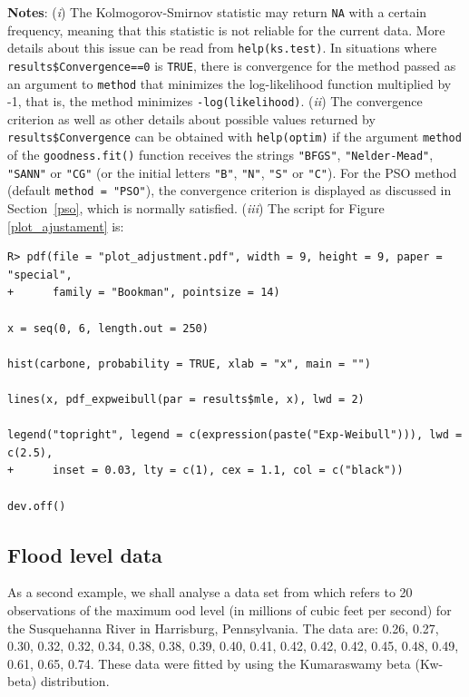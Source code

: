 \documentclass[10pt,letterpaper]{article}
\begin{document}
\textbf{Notes}: ({\it i}) The Kolmogorov-Smirnov statistic may return \texttt{NA} with a certain frequency,
meaning  that this statistic is not reliable for the current data.
More details about this issue can be read from \texttt{help(ks.test)}.
In situations where \texttt{results\$Convergence==0} is \texttt{TRUE}, there is convergence for the method passed as an argument
to \texttt{method} that minimizes the log-likelihood function multiplied by -1, that is, the method minimizes \texttt{-log(likelihood)}.
({\it ii}) The convergence criterion as well as other details about possible values returned by \texttt{results\$Convergence}
can be obtained with \texttt{help(optim)} if the argument \texttt{method} of the \texttt{goodness.fit()} function receives
the strings \texttt{"BFGS"}, \texttt{"Nelder-Mead"}, \texttt{"SANN"} or \texttt{"CG"} (or the initial letters \texttt{"B"}, \texttt{"N"}, \texttt{"S"} or \texttt{"C"}).
For the PSO method  (default \texttt{method = "PSO"}), the convergence criterion is displayed as discussed in Section~\ref{pso}, which is normally  satisfied.
({\it iii}) The script for Figure \ref{plot_ajustament} is:

\begin{verbatim}
R> pdf(file = "plot_adjustment.pdf", width = 9, height = 9, paper = "special",
+      family = "Bookman", pointsize = 14)

x = seq(0, 6, length.out = 250)

hist(carbone, probability = TRUE, xlab = "x", main = "")

lines(x, pdf_expweibull(par = results$mle, x), lwd = 2)

legend("topright", legend = c(expression(paste("Exp-Weibull"))), lwd = c(2.5),
+      inset = 0.03, lty = c(1), cex = 1.1, col = c("black"))

dev.off()
\end{verbatim}


\subsection{Flood level data}

As a second example, we shall analyse a data set from \cite{Dumonceaux73} which refers to 20 observations of
the maximum ood level (in millions of cubic feet per second) for the Susquehanna River in Harrisburg, Pennsylvania.
The data are: 0.26, 0.27, 0.30, 0.32, 0.32, 0.34, 0.38, 0.38, 0.39, 0.40, 0.41, 0.42, 0.42, 0.42, 0.45,
0.48, 0.49, 0.61, 0.65, 0.74.
These data were fitted by using the Kumaraswamy beta (Kw-beta) distribution.
\end{document}
